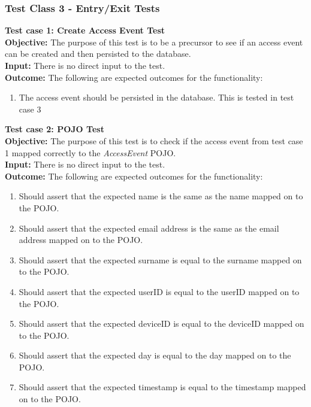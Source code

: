 \documentclass[11pt,a4paper]{article}
\begin{document}
\subsubsection{Test Class 3 - Entry/Exit Tests}	
\textbf{Test case 1: Create Access Event Test} \\
\textbf{Objective: } The purpose of this test is to be a precursor to see if an access event can be created and then persisted to the database. \\
\textbf{Input: } There is no direct input to the test. \\
\textbf{Outcome: } The following are expected outcomes for the functionality: 
\begin{enumerate}
	\item The access event should be persisted in the database. This is tested in test case 3\\
\end{enumerate}
\noindent
\textbf{Test case 2: POJO Test} \\
\textbf{Objective: } The purpose of this test is to check if the access event from test case 1 mapped correctly to the \textit{AccessEvent} POJO. \\
\textbf{Input: } There is no direct input to the test. \\
\textbf{Outcome: } The following are expected outcomes for the functionality:
\begin{enumerate}
	\item Should assert that the expected name is the same as the name mapped on to the POJO.
	\item Should assert that the expected email address is the same as the email address mapped on to the POJO.
	\item Should assert that the expected surname is equal to the surname mapped on to the POJO.
	\item Should assert that the expected userID is equal to the userID mapped on to the POJO.
	\item Should assert that the expected deviceID is equal to the deviceID mapped on to the POJO.
	\item Should assert that the expected day is equal to the day mapped on to the POJO.
	\item Should assert that the expected timestamp is equal to the timestamp mapped on to the POJO.\\
\end{enumerate}
\end{document}
